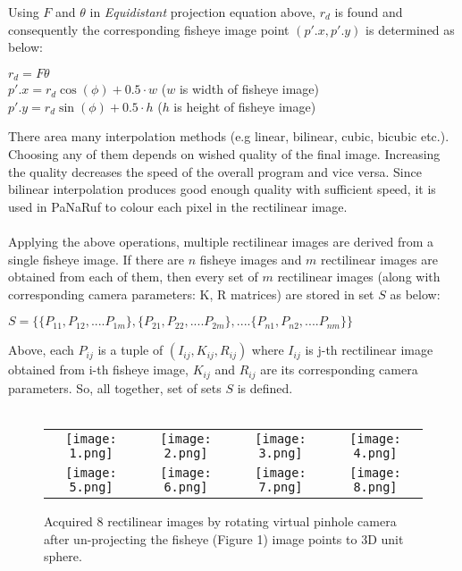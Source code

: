 \documentclass{article}
\begin{document}
Using $F$ and $\theta$ in \textit{Equidistant} projection equation above, $r_{d}$ is found and consequently the corresponding fisheye image point $(p'.x, p'.y)$ is determined as below:
\begin{center}
    $r_{d} = F\theta$\\
    $p'.x = r_{d}\cos(\phi) + 0.5 \cdot w$ ($w$ is width of fisheye image)\\
    $p'.y = r_{d}\sin(\phi) + 0.5 \cdot h$ ($h$ is height of fisheye image)\\
\end{center}
There area many interpolation methods (e.g linear, bilinear, cubic, bicubic etc.). Choosing any of them depends on wished quality of the final image. Increasing the quality decreases the speed of the overall program and vice versa. Since bilinear interpolation produces good enough quality with sufficient speed, it is used in PaNaRuf to colour each pixel in the rectilinear image.\\~\\
Applying the above operations, multiple rectilinear images are derived from a single fisheye image. If there are $n$ fisheye images and $m$ rectilinear images are obtained from each of them, then every set of $m$ rectilinear images (along with corresponding camera parameters: K, R matrices) are stored in set $S$ as below:
\begin{center}
$S = \{\{P_{11},P_{12},....P_{1m}\}, \{P_{21},P_{22},....P_{2m}\} ,....\{P_{n1},P_{n2},....P_{nm}\}\}$
\end{center}
Above, each $P_{ij}$ is a tuple of $(I_{ij}, K_{ij} , R_{ij})$ where $I_{ij}$ is j-th rectilinear image obtained from i-th fisheye image, $K_{ij}$ and $R_{ij}$ are its corresponding camera parameters. So, all together,  set of sets $S$ is defined.\\~\\
\begin{figure}[!hb]
\centering
\begin{tabular}{c c c c}
\texttt{[image: 1.png]}&
\texttt{[image: 2.png]}&
\texttt{[image: 3.png]}&
\texttt{[image: 4.png]}\\
\texttt{[image: 5.png]}&
\texttt{[image: 6.png]}&
\texttt{[image: 7.png]}&
\texttt{[image: 8.png]}
\end{tabular}
	\caption{Acquired 8 rectilinear images by rotating virtual pinhole camera after un-projecting the fisheye (Figure 1) image points to 3D unit sphere.}
\end{figure}
\end{document}
